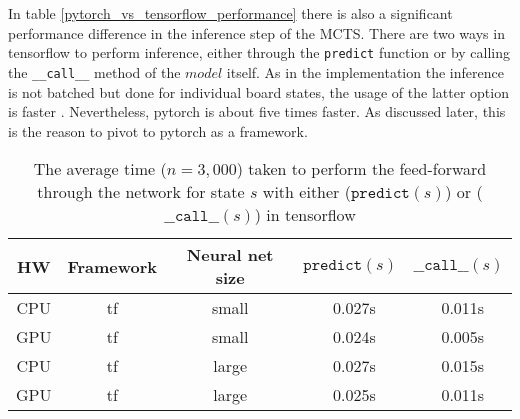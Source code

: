 In table \ref{pytorch_vs_tensorflow_performance} there is also a significant performance difference in the inference step of the MCTS. There are two ways in tensorflow to perform inference, either through the \texttt{predict} function or by calling the \texttt{\_\_call\_\_} method of the $model$ itself. As in the implementation the inference is not batched but done for individual board states, the usage of the latter option is faster \cite{noauthor_tfkerasmodel_nodate}. Nevertheless, pytorch is about five times faster. As discussed later, this is the reason to pivot to pytorch as a framework.

\begin{table*}
    \begin{center}
        \begin{tabular}{ c|c|c|c|c }
            HW  & Framework & Neural net size & $\texttt{predict}(s)$ & $\texttt{\_\_call\_\_}(s)$ \\
            \hline
            \hline
            CPU & tf        & small           & ~0.027s               & ~0.011s                    \\
            GPU & tf        & small           & ~0.024s               & ~0.005s                    \\
            CPU & tf        & large           & ~0.027s               & ~0.015s                    \\
            GPU & tf        & large           & ~0.025s               & ~0.011s                    \\
        \end{tabular}
    \end{center}
    \caption{The average time ($n = 3,000$) taken to perform the feed-forward through the network for state $s$ with either ($\texttt{predict}(s)$) or ($\texttt{\_\_call\_\_}(s)$) in tensorflow}\label{tensorflow_predict_vs_call}
\end{table*}

